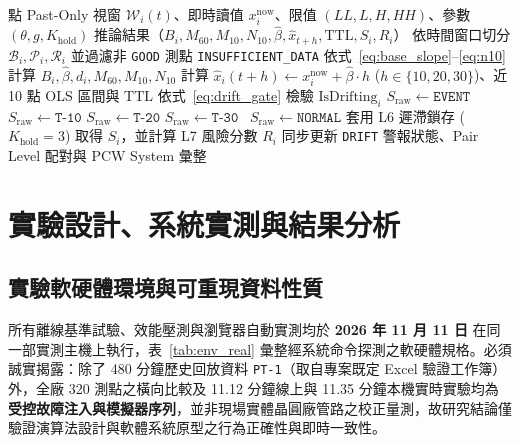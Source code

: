 \documentclass[fontset=none, a4paper, 12pt]{ctexart}
\begin{document}
\begin{doublespace}
\begin{algorithm}[H]
\caption{統一雙視窗異常密度與七層工業硬化預警演算法 (Unified V1)}
\label{alg:unified_v1}
\begin{algorithmic}[1]
 點 Past-Only 視窗 $\mathcal{W}_i(t)$、即時讀值 $x_i^{\mathrm{now}}$、限值 $(LL, L, H, HH)$、參數 $(\theta, g, K_{\mathrm{hold}})$
\Ensure 推論結果（$B_i, M_{60}, M_{10}, N_{10}, \hat{\beta}, \hat{x}_{t+h}, \mathrm{TTL}, S_i, R_i$）
\State 依時間窗口切分 $\mathcal{B}_i, \mathcal{P}_i, \mathcal{R}_i$ 並過濾非 \texttt{GOOD} 測點
    \State \Return \texttt{INSUFFICIENT\_DATA} 
\EndIf
\State 依式~\eqref{eq:base_slope}--\eqref{eq:n10} 計算 $B_i, \hat{\beta}, d_i, M_{60}, M_{10}, N_{10}$
\State 計算 $\hat{x}_i(t+h) \leftarrow x_i^{\mathrm{now}} + \hat{\beta}\cdot h$ ($h\in\{10,20,30\}$)、近 10 點 OLS 區間與 $\mathrm{TTL}$ 
\State 依式~\eqref{eq:drift_gate} 檢驗 $\mathrm{IsDrifting}_i$ 
    \State $S_{\mathrm{raw}} \leftarrow \texttt{EVENT}$ 
 $S_{\mathrm{raw}} \leftarrow \texttt{T-10}$
 $S_{\mathrm{raw}} \leftarrow \texttt{T-20}$
 $S_{\mathrm{raw}} \leftarrow \texttt{T-30}$
\Else\ $S_{\mathrm{raw}} \leftarrow \texttt{NORMAL}$
\EndIf
\State 套用 L6 遲滯鎖存 ($K_{\mathrm{hold}}=3$) 取得 $S_i$，並計算 L7 風險分數 $R_i$
\State 同步更新 \texttt{DRIFT} 警報狀態、Pair Level 配對與 PCW System 彙整
\end{algorithmic}
\end{algorithm}

\clearpage
\section{實驗設計、系統實測與結果分析}

\subsection{實驗軟硬體環境與可重現資料性質}
所有離線基準試驗、效能壓測與瀏覽器自動實測均於 \textbf{2026 年 11 月 11 日} 在同一部實測主機上執行，表~\ref{tab:env_real} 彙整經系統命令探測之軟硬體規格。必須誠實揭露：除了 480 分鐘歷史回放資料 \texttt{PT-1}（取自專案既定 Excel 驗證工作簿）外，全廠 320 測點之橫向比較及 11.12 分鐘線上與 11.35 分鐘本機實時實驗均為\textbf{受控故障注入與模擬器序列}，並非現場實體晶圓廠管路之校正量測，故研究結論僅驗證演算法設計與軟體系統原型之行為正確性與即時一致性。


\end{doublespace}
\end{document}
